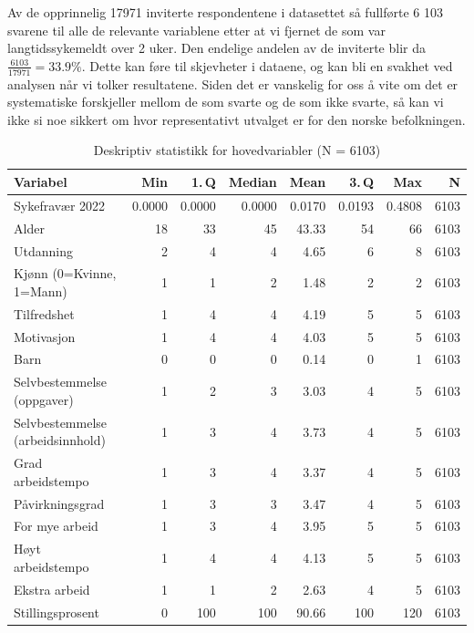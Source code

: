 \documentclass[
  12pt,
  a4paper,
  DIV=11,
  numbers=noendperiod]{scrartcl}
\begin{document}
Av de opprinnelig 17971 inviterte respondentene i datasettet så
fullførte 6 103 svarene til alle de relevante variablene etter at vi
fjernet de som var langtidssykemeldt over 2 uker. Den endelige andelen
av de inviterte blir da \(\frac{6103}{17971} = 33.9\%\). Dette kan føre
til skjevheter i dataene, og kan bli en svakhet ved analysen når vi
tolker resultatene. Siden det er vanskelig for oss å vite om det er
systematiske forskjeller mellom de som svarte og de som ikke svarte, så
kan vi ikke si noe sikkert om hvor representativt utvalget er for den
norske befolkningen.

\begin{table}[ht]
\centering
\begin{tabular}{lrrrrrrr}
\toprule
Variabel                               & Min    & 1.\,Q  & Median & Mean   & 3.\,Q  & Max    & N    \\
\midrule
Sykefravær 2022                        & 0.0000 & 0.0000 & 0.0000 & 0.0170 & 0.0193 & 0.4808 & 6103 \\
Alder                                  & 18     & 33     & 45     & 43.33  & 54     & 66     & 6103 \\
Utdanning                              & 2      & 4      & 4      & 4.65   & 6      & 8      & 6103 \\
Kjønn (0=Kvinne, 1=Mann)               & 1      & 1      & 2      & 1.48   & 2      & 2      & 6103 \\
Tilfredshet                            & 1      & 4      & 4      & 4.19   & 5      & 5      & 6103 \\
Motivasjon                             & 1      & 4      & 4      & 4.03   & 5      & 5      & 6103 \\
Barn                                   & 0      & 0      & 0      & 0.14   & 0      & 1      & 6103 \\
Selvbestemmelse (oppgaver)             & 1      & 2      & 3      & 3.03   & 4      & 5      & 6103 \\
Selvbestemmelse (arbeidsinnhold)       & 1      & 3      & 4      & 3.73   & 4      & 5      & 6103 \\
Grad arbeidstempo                      & 1      & 3      & 4      & 3.37   & 4      & 5      & 6103 \\
Påvirkningsgrad                        & 1      & 3      & 3      & 3.47   & 4      & 5      & 6103 \\
For mye arbeid                         & 1      & 3      & 4      & 3.95   & 5      & 5      & 6103 \\
Høyt arbeidstempo                      & 1      & 4      & 4      & 4.13   & 5      & 5      & 6103 \\
Ekstra arbeid                          & 1      & 1      & 2      & 2.63   & 4      & 5      & 6103 \\
Stillingsprosent                       & 0      & 100    & 100    & 90.66  & 100    & 120    & 6103 \\
\bottomrule
\end{tabular}
\caption{Deskriptiv statistikk for hovedvariabler (N = 6103)}
\label{tab:deskriptiv}
\end{table}
\end{document}
